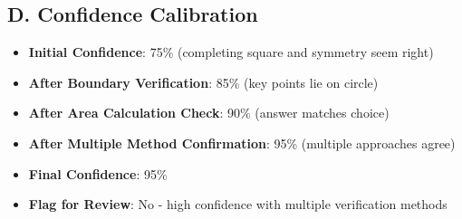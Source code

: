 \documentclass[]{article}
\begin{document}
\begin{verificationbox}
\subsection*{D. Confidence Calibration}
\begin{itemize}[leftmargin=*]
    \item \textbf{Initial Confidence}: 75\% (completing square and symmetry seem right)
    \item \textbf{After Boundary Verification}: 85\% (key points lie on circle)
    \item \textbf{After Area Calculation Check}: 90\% (answer matches choice)
    \item \textbf{After Multiple Method Confirmation}: 95\% (multiple approaches agree)
    \item \textbf{Final Confidence}: 95\%
    \item \textbf{Flag for Review}: No - high confidence with multiple verification methods
\end{itemize}
\end{verificationbox}
\end{document}
